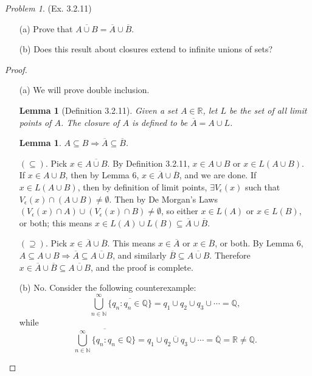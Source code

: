 \documentclass[11pt,twoside, reqno]{amsart}
\newtheorem{Lm}[Thm]{Lemma}
\theoremstyle{remark}
\newtheorem{Prob}{Problem}
\def\R{\mathbb R}
\def\Q{\mathbb Q}
\def\N{\mathbb N}
\renewcommand{\implies}{\Rightarrow}
\begin{document}
\begin{Prob}(Ex. 3.2.11) 
\begin{enumerate}
    \item [(a)] Prove that $\overline{A \cup B} = \overline{A} \cup \overline{B}$.
    \item [(b)] Does this result about closures extend to infinite unions of sets?
\end{enumerate}
\end{Prob}

\begin{proof}
\begin{enumerate}
    \item [(a)] We will prove double inclusion.
    
    \begin{Lm}[Definition 3.2.11]
    Given a set $A \in \R$, let $L$ be the set of all limit points of $A$. The \textit{closure} of $A$ is defined to be $\overline{A} = A \cup L$.
    \end{Lm}
    
    \begin{Lm}
    $A \subseteq B \implies \overline{A} \subseteq \overline{B}$.
    \end{Lm}
    
    $(\subseteq)$. Pick $x \in \overline{A \cup B}$. By Definition 3.2.11, $x \in A \cup B$ or $x \in L(A \cup B)$. If $x \in A \cup B$, then by Lemma 6, $x \in \overline{A} \cup \overline{B}$, and we are done. If $x \in L(A \cup B)$, then by definition of limit points, $\exists V_\epsilon(x)$ such that $V_\epsilon(x) \cap (A \cup B) \neq \emptyset$. Then by De Morgan's Laws $(V_\epsilon(x) \cap A) \cup (V_\epsilon(x) \cap B) \neq \emptyset$, so either $x \in L(A)$ or $x \in L(B)$, or both; this means $x \in L(A) \cup L(B) \subseteq \overline{A} \cup \overline{B}$.
    
    $(\supseteq)$. Pick $x \in \overline{A} \cup \overline{B}$. This means $x \in \overline{A}$ or $x \in \overline{B}$, or both. By Lemma 6, $A \subseteq A \cup B \implies \overline{A} \subseteq \overline{A \cup B}$, and similarly $\overline{B} \subseteq \overline{A \cup B}$. Therefore $x \in \overline{A} \cup \overline{B} \subseteq \overline{A \cup B}$, and the proof is complete.
    \item [(b)] No. Consider the following counterexample:
    $$
        \bigcup^\infty_{n \in \N}\overline{\{q_n : q_n \in \Q\}} = q_1 \cup q_2 \cup q_3 \cup \cdots = \Q,
    $$
    while
    $$
        \overline{\bigcup^\infty_{n \in \N}\{q_n : q_n \in \Q\}} = \overline{q_1 \cup q_2 \cup q_3 \cup \cdots} = \overline{\Q} = \R \neq \Q.
    $$
\end{enumerate}

\end{proof}
\end{document}
